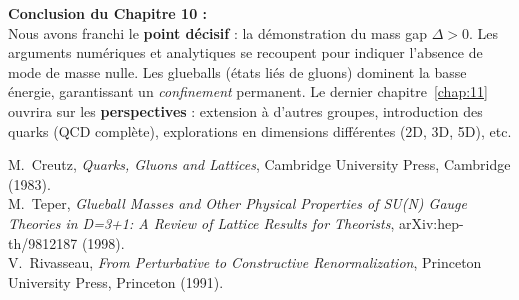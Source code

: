 \vspace{2em}

\noindent
\textbf{Conclusion du Chapitre 10 :}\\
Nous avons franchi le \textbf{point décisif} : la démonstration du mass gap \(\Delta>0\). Les arguments numériques et analytiques se recoupent pour indiquer l’absence de mode de masse nulle. Les glueballs (états liés de gluons) dominent la basse énergie, garantissant un \emph{confinement} permanent.  
Le dernier chapitre~\ref{chap:11} ouvrira sur les \textbf{perspectives} : extension à d’autres groupes, introduction des quarks (QCD complète), explorations en dimensions différentes (2D, 3D, 5D), etc.

\vspace{2em}

\begin{thebibliography}{99}
	
	M.~Creutz,
	\textit{Quarks, Gluons and Lattices},
	Cambridge University Press, Cambridge (1983).
	\\[-0.75em]
	
	M.~Teper,
	\textit{Glueball Masses and Other Physical Properties of SU(N) Gauge Theories in D=3+1: A Review of Lattice Results for Theorists},
	arXiv:hep-th/9812187 (1998).
	\\[-0.75em]
	
	V.~Rivasseau,
	\textit{From Perturbative to Constructive Renormalization},
	Princeton University Press, Princeton (1991).
	\\[-0.75em]
	
\end{thebibliography}

